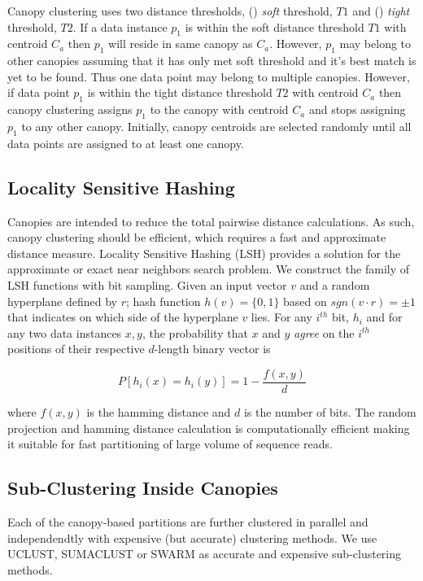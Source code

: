 \documentclass[letterpaper,twocolumn]{article}
\begin{document}
Canopy clustering uses two distance 
thresholds, () \textit{soft} threshold, $T1$ and () \textit{tight} threshold, $T2$. If a data instance 
$p_1$ is within the 
soft distance threshold $T1$ with centroid $C_a$ then $p_1$ will reside in same canopy as $C_a$. However,  $p_1$ may belong to other 
canopies assuming that it has only met soft threshold and it's 
best match is yet to be found. Thus one data point may belong to multiple canopies. However, 
if data point $p_1$ is within the tight distance threshold $T2$ with centroid $C_a$ then canopy clustering assigns $p_1$ to the  canopy with centroid $C_a$ 
and stops 
assigning $p_1$ to any other canopy. Initially, canopy centroids are selected 
randomly until all data points are
assigned to at least one canopy. 

\subsection{Locality Sensitive Hashing}
Canopies are intended to reduce the total pairwise distance calculations. As such, canopy clustering 
should be efficient, which requires a fast and approximate distance measure. Locality Sensitive Hashing (LSH)\cite{MARLshRef2} provides a solution for the approximate or exact near neighbors search problem. We construct the family of LSH functions with bit sampling\cite{indyk1998approximate}. Given an input vector $v$ and a random hyperplane defined by $r$; hash function $h(v)=\{0,1\}$ based on $sgn(v\cdot{r})=\pm{1}$ that indicates on which side of the hyperplane $v$ lies. For any $i^{th}$ bit, $h_i$ and for any two data instances $x,y$, 
the probability that $x$ and $y$ \emph{agree} on the $i^{th}$ positions of their respective $d$-length binary vector is

\begin{equation}
P[h_i(x)=h_i(y)]=1-\frac{f(x,y)}{d} 
\end{equation}

where $f(x,y)$ is the hamming distance and $d$ is the number of bits. The random projection and hamming distance calculation is computationally efficient making it suitable for fast partitioning of large volume of sequence reads. 

\subsection{Sub-Clustering Inside Canopies}
\label{sub-cluster}
Each of the canopy-based 
partitions are 
further clustered in parallel and independendtly 
with  expensive (but accurate)  clustering methods. We use UCLUST\cite{MARuclust}, SUMACLUST\cite{MARSumaclust} or 
SWARM\cite{MARSwarm2}  as accurate and 
expensive sub-clustering methods. 
\end{document}

